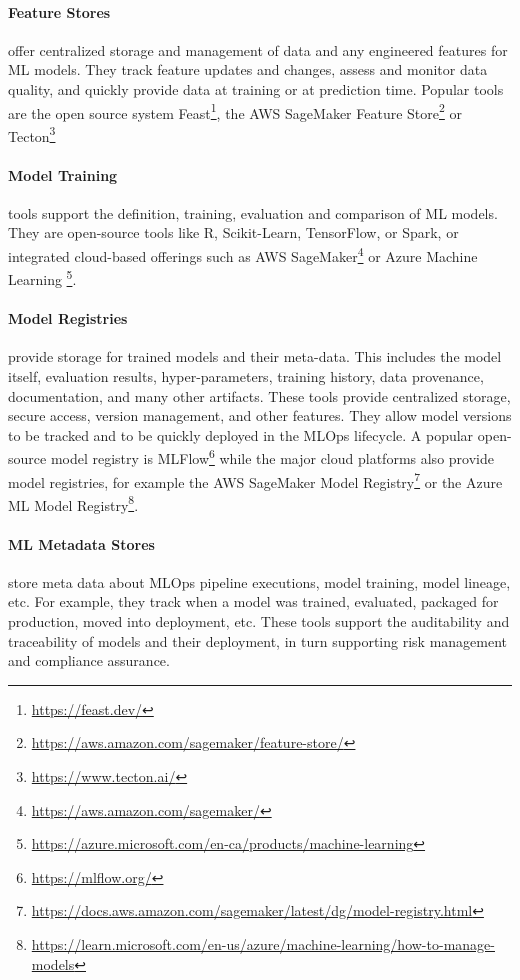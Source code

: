 \paragraph*{Feature Stores} offer centralized storage and management of data and any engineered features for ML models. They track feature updates and changes, assess and monitor data quality, and quickly provide data at training or at prediction time. Popular tools are the open source system Feast\footnote{\url{https://feast.dev/}}, the AWS SageMaker Feature Store\footnote{\url{https://aws.amazon.com/sagemaker/feature-store/}} or Tecton\footnote{\url{https://www.tecton.ai/}}

\paragraph*{Model Training} tools support the definition, training, evaluation and comparison of ML models. They are open-source tools like R, Scikit-Learn, TensorFlow, or Spark, or integrated cloud-based offerings such as AWS SageMaker\footnote{\url{https://aws.amazon.com/sagemaker/}} or Azure Machine Learning \footnote{\url{https://azure.microsoft.com/en-ca/products/machine-learning}}. 

\paragraph*{Model Registries} provide storage for trained models and their meta-data. This includes the model itself, evaluation results, hyper-parameters, training history, data provenance, documentation, and many other artifacts. These tools provide centralized storage, secure access, version management, and other features. They allow model versions to be tracked and to be quickly deployed in the MLOps lifecycle. A popular open-source model registry is MLFlow\footnote{\url{https://mlflow.org/}} while the major cloud platforms also provide model registries, for example the AWS SageMaker Model Registry\footnote{\url{https://docs.aws.amazon.com/sagemaker/latest/dg/model-registry.html}} or the Azure ML Model Registry\footnote{\url{https://learn.microsoft.com/en-us/azure/machine-learning/how-to-manage-models}}.

\paragraph*{ML Metadata Stores} store meta data about MLOps pipeline executions, model training, model lineage, etc. For example, they track when a model was trained, evaluated, packaged for production, moved into deployment, etc. These tools support the auditability and traceability of models and their deployment, in turn supporting risk management and compliance assurance.


